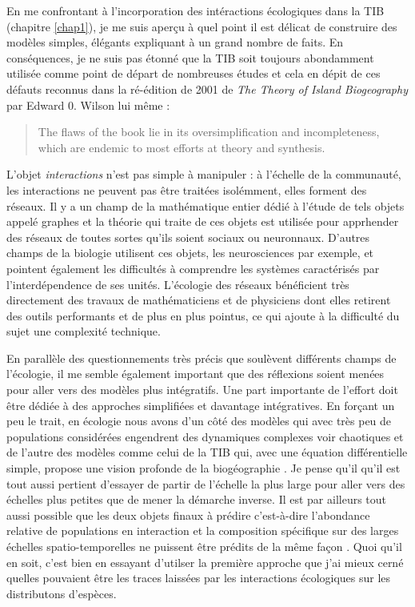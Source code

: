 En me confrontant à l'incorporation des intéractions écologiques dans la
TIB (chapitre \ref{chap1}), je me suis aperçu à quel point il est
délicat de construire des modèles simples, élégants expliquant à un
grand nombre de faits. En conséquences, je ne suis pas étonné que la TIB
soit toujours abondamment utilisée comme point de départ de nombreuses
études \citep{Warren2015} et cela en dépit de ces défauts reconnus dans
la ré-édition de 2001 de \emph{The Theory of Island Biogeography} par
Edward 0. Wilson lui même :

\begin{quote}
The flaws of the book lie in its oversimplification and incompleteness,
which are endemic to most efforts at theory and synthesis.
\end{quote}

L'objet \emph{interactions} n'est pas simple à manipuler : à l'échelle
de la communauté, les interactions ne peuvent pas être traitées
isolémment, elles forment des réseaux. Il y a un champ de la
mathématique entier dédié à l'étude de tels objets appelé graphes et la
théorie qui traite de ces objets est utilisée pour apprhender des
réseaux de toutes sortes qu'ils soient sociaux ou neuronnaux. D'autres
champs de la biologie utilisent ces objets, les neurosciences par
exemple, et pointent également les difficultés à comprendre les systèmes
caractérisés par l'interdépendence de ses unités. L'écologie des réseaux
bénéficient très directement des travaux de mathématiciens et de
physiciens dont elles retirent des outils performants et de plus en plus
pointus, ce qui ajoute à la difficulté du sujet une complexité
technique.

En parallèle des questionnements très précis que soulèvent différents
champs de l'écologie, il me semble également important que des
réflexions soient menées pour aller vers des modèles plus intégratifs.
Une part importante de l'effort doit être dédiée à des approches
simplifiées et davantage intégratives. En forçant un peu le trait, en
écologie nous avons d'un côté des modèles qui avec très peu de
populations considérées engendrent des dynamiques complexes voir
chaotiques \citep[dont l'existence est validée
expérimentalement][]{Costantino1997b, Fussmann2000} et de l'autre des
modèles comme celui de la TIB qui, avec une équation différentielle
simple, propose une vision profonde de la biogéographie
\citep{MacArthur1967}. Je pense qu'il qu'il est tout aussi pertient
d'essayer de partir de l'échelle la plus large pour aller vers des
échelles plus petites que de mener la démarche inverse. Il est par
ailleurs tout aussi possible que les deux objets finaux à prédire
c'est-à-dire l'abondance relative de populations en interaction et la
composition spécifique sur des larges échelles spatio-temporelles ne
puissent être prédits de la même façon \citep[ce qui serait une forme de
\emph{rupture de symétrie}][]{Anderson1972}. Quoi qu'il en soit, c'est
bien en essayant d'utilser la première approche que j'ai mieux cerné
quelles pouvaient être les traces laissées par les interactions
écologiques sur les distributons d'espèces.

